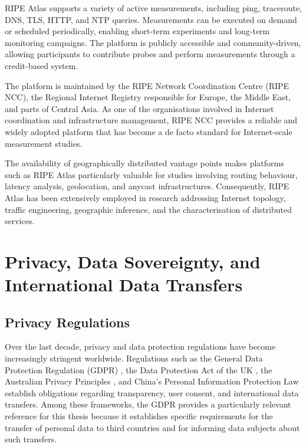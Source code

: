 \documentclass[
A4paper,                %
twoside,                %
openright,              %
chapterprefix=true,     %
12pt,                   %
headings=normal,        %
titlepage=on            %
]{book}
\begin{document}
RIPE Atlas supports a variety of active measurements, including ping, traceroute, DNS, TLS, HTTP, and NTP queries. Measurements can be executed on demand or scheduled periodically, enabling short-term experiments and long-term monitoring campaigns. The platform is publicly accessible and community-driven, allowing participants to contribute probes and perform measurements through a credit-based system.

The platform is maintained by the RIPE Network Coordination Centre (RIPE NCC), the Regional Internet Registry responsible for Europe, the Middle East, and parts of Central Asia. As one of the organisations involved in Internet coordination and infrastructure management, RIPE NCC provides a reliable and widely adopted platform that has become a de facto standard for Internet-scale measurement studies.

The availability of geographically distributed vantage points makes platforms such as RIPE Atlas particularly valuable for studies involving routing behaviour, latency analysis, geolocation, and anycast infrastructures. Consequently, RIPE Atlas has been extensively employed in research addressing Internet topology, traffic engineering, geographic inference, and the characterisation of distributed services.

\section{Privacy, Data Sovereignty, and International Data Transfers}
\label{sc:background_privacy}

\subsection{Privacy Regulations}
\label{sc:background_privacy_regulations}

Over the last decade, privacy and data protection regulations have become increasingly stringent worldwide. Regulations such as the General Data Protection Regulation (GDPR) \cite{REGULATIONSRelevance}, the Data Protection Act of the UK \cite{Data2018}, the Australian Privacy Principles \cite{ReadOAIC}, and China's Personal Information Protection Law \cite{TheTranslation} establish obligations regarding transparency, user consent, and international data transfers. Among these frameworks, the GDPR provides a particularly relevant reference for this thesis because it establishes specific requirements for the transfer of personal data to third countries and for informing data subjects about such transfers.
\end{document}
